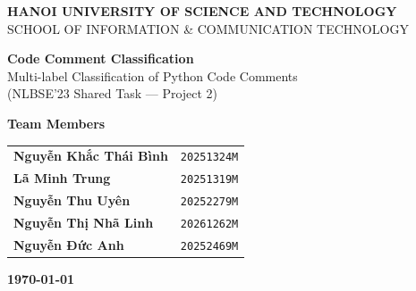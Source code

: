 \documentclass[11pt,a4paper]{article}
\begin{document}
\begin{titlepage}

\centering

{\large \textbf{HANOI UNIVERSITY OF SCIENCE AND TECHNOLOGY}}\\[0.3cm]
{\normalsize SCHOOL OF INFORMATION \& COMMUNICATION TECHNOLOGY}

\vspace{6cm}

\begin{center}
{\Large\textbf{Code Comment Classification}}\\[0.3cm]
{\large Multi-label Classification of Python Code Comments}\\[0.2cm]
{\large (NLBSE'23 Shared Task --- Project 2)}
\end{center}

\vspace{2cm}

\begin{minipage}{0.8\textwidth}
\centering
\textbf{\large Team Members}

\vspace{0.5cm}

\begin{tabular}{@{}ll@{}}
\textbf{Nguyễn Khắc Thái Bình} & \texttt{20251324M} \\[0.3cm]
\textbf{Lã Minh Trung}         & \texttt{20251319M} \\[0.3cm]
\textbf{Nguyễn Thu Uyên}       & \texttt{20252279M} \\[0.3cm]
\textbf{Nguyễn Thị Nhã Linh}   & \texttt{20261262M} \\[0.3cm]
\textbf{Nguyễn Đức Anh}        & \texttt{20252469M} \\[0.3cm]
\end{tabular}
\end{minipage}

\vspace{2.5cm}

\begin{minipage}{0.7\textwidth}
\centering
{}
\end{minipage}

\vfill

{\large \textbf{\today}}

\end{titlepage}
\end{document}

